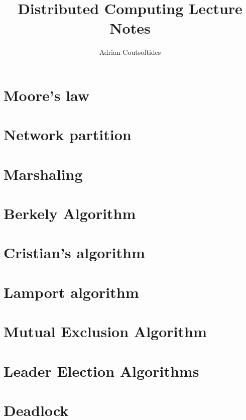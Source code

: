 \documentclass{easyclass}
\begin{document}
\begin{titlepage}
    \title{Distributed Computing Lecture Notes}
    \author{Adrian Coutsoftides}
    \maketitle
\end{titlepage}

\tableofcontents

\chapter{Moore's law}

\chapter{Network partition}

\chapter{Marshaling}

\chapter{Berkely Algorithm}

\chapter{Cristian's algorithm}

\chapter{Lamport algorithm}

\chapter{Mutual Exclusion Algorithm}

\chapter{Leader Election Algorithms}

\chapter{Deadlock}
\end{document}
